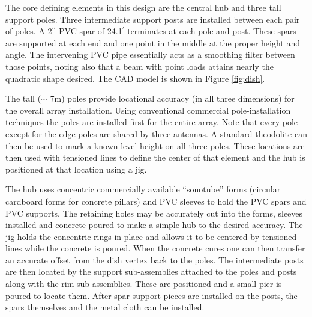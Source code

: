 \documentclass[preprint]{aastex}
\begin{document}

The core defining elements in this design are the central hub and three tall support poles.  Three intermediate 
support posts are installed between each pair of poles.  A 2$^{\prime\prime}$ PVC spar of 24.1$^{\prime}$ 
terminates at each pole and post.  These spars are supported at each end and one point in the middle at the 
proper height and angle.  The intervening PVC pipe essentially acts as a smoothing filter between those 
points, noting also that a beam with point loads attains nearly the quadratic shape desired.  The CAD model is 
shown in Figure \ref{fig:dish}.  

The tall ($\sim$ 7m) poles provide locational accuracy (in all three dimensions) for the overall array installation.  
Using conventional commercial pole-installation techniques the poles are installed first for the entire array.  
Note that every pole except for the edge poles are shared by three antennas.  A standard theodolite can 
then be used to mark a known level height on all three poles.  These locations are then used with tensioned 
lines to define the center of that element and the hub is positioned at that location using a jig.

The hub uses concentric commercially available ``sonotube'' forms (circular cardboard forms for concrete pillars) 
and PVC sleeves to hold the PVC spars and PVC supports.  The retaining holes may be accurately cut into 
the forms, sleeves installed and concrete poured to make a simple hub to the desired accuracy.  The jig holds 
the concentric rings in place and allows it to be centered by tensioned lines while the concrete is poured.  
When the concrete cures one can then transfer an accurate offset from the dish vertex back to the poles.
The intermediate posts are then located by the support sub-assemblies attached to the poles and posts along 
with the rim sub-assemblies.  These are positioned and a small pier is poured to locate them.  After spar support 
pieces are installed on the posts, the spars themselves and the metal cloth can be installed.
\end{document}

